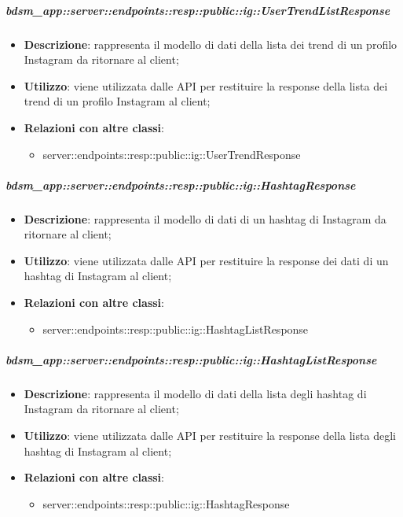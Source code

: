     \subparagraph{bdsm\_app::server::endpoints::resp::public::ig::UserTrendListResponse} %
    \label{subp:bdsm_app_server_endpoints_resp_public_ig_usertrendlistresponse}
    \begin{itemize}
      \item \textbf{Descrizione}: rappresenta il modello di dati della lista dei trend di un profilo Instagram da ritornare al client;
      \item \textbf{Utilizzo}: viene utilizzata dalle API per restituire la response della lista dei trend di un profilo Instagram al client;
      \item \textbf{Relazioni con altre classi}:
        \begin{itemize}
          \item server::endpoints::resp::public::ig::UserTrendResponse
        \end{itemize}
      \end{itemize}
    
    \subparagraph{bdsm\_app::server::endpoints::resp::public::ig::HashtagResponse} %
    \label{subp:bdsm_app_server_endpoints_resp_public_ig_hashtagresponse}
    \begin{itemize}
      \item \textbf{Descrizione}: rappresenta il modello di dati di un hashtag di Instagram da ritornare al client;
      \item \textbf{Utilizzo}: viene utilizzata dalle API per restituire la response dei dati di un hashtag di Instagram al client;
      \item \textbf{Relazioni con altre classi}:
        \begin{itemize}
          \item server::endpoints::resp::public::ig::HashtagListResponse
        \end{itemize}
      \end{itemize}
    
    \subparagraph{bdsm\_app::server::endpoints::resp::public::ig::HashtagListResponse} %
    \label{subp:bdsm_app_server_endpoints_resp_public_ig_hashtaglistresponse}
    \begin{itemize}
      \item \textbf{Descrizione}: rappresenta il modello di dati della lista degli hashtag di Instagram da ritornare al client;
      \item \textbf{Utilizzo}: viene utilizzata dalle API per restituire la response della lista degli hashtag di Instagram al client;
      \item \textbf{Relazioni con altre classi}:
        \begin{itemize}
          \item server::endpoints::resp::public::ig::HashtagResponse
        \end{itemize}
      \end{itemize}
    
